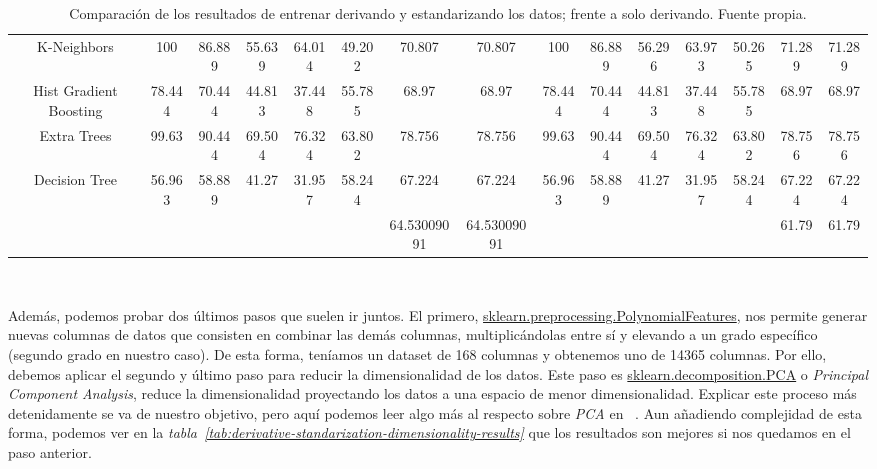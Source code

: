 \begin{table}[!ht]
{\begin{tabular}{|c|ccccccc|ccccccc|}
        K-Neighbors & 100 & 86.889 & 55.639 & 64.014 & 49.202 & 70.807 & 70.807 & 100 & 86.889 & 56.296 & 63.973 & 50.265 & 71.289 & 71.289 \\
        Hist Gradient Boosting & 78.444 & 70.444 & 44.813 & 37.448 & 55.785 & 68.97 & 68.97 & 78.444 & 70.444 & 44.813 & 37.448 & 55.785 & 68.97 & 68.97 \\
        Extra Trees & 99.63 & 90.444 & 69.504 & 76.324 & 63.802 & 78.756 & 78.756 & 99.63 & 90.444 & 69.504 & 76.324 & 63.802 & 78.756 & 78.756 \\
        Decision Tree & 56.963 & 58.889 & 41.27 & 31.957 & 58.244 & 67.224 & 67.224 & 56.963 & 58.889 & 41.27 & 31.957 & 58.244 & 67.224 & 67.224 \\ \hline
        & & & & & & 64.53009091 & 64.53009091 & & & & & & 61.79 & 61.79 \\ \hline
        \end{tabular}}
    \caption{Comparación de los resultados de entrenar derivando y estandarizando los datos; frente a solo derivando. Fuente propia.}\ \label{tab:derivative-standarization-results}
\end{table}


Además, podemos probar dos últimos pasos que suelen ir juntos. El primero, \href{https://scikit-learn.org/stable/modules/generated/sklearn.preprocessing.PolynomialFeatures.html}{sklearn.preprocessing.PolynomialFeatures}, 
nos permite generar nuevas columnas de datos que consisten en combinar las demás columnas, multiplicándolas entre sí y elevando a un grado específico (segundo grado en nuestro caso). 
De esta forma, teníamos un \gls{dataset} de 168 columnas y obtenemos uno de 14365 columnas. Por ello, debemos aplicar el segundo y último paso para reducir la dimensionalidad
de los datos. Este paso es \href{https://scikit-learn.org/stable/modules/generated/sklearn.decomposition.PCA.html}{sklearn.decomposition.PCA} o \textit{Principal Component Analysis},
reduce la dimensionalidad proyectando los datos a una espacio de menor dimensionalidad. Explicar este proceso más detenidamente se va de nuestro objetivo, pero
aquí podemos leer algo más al respecto sobre \textit{PCA} en \ \cite{Principa62:online}.
Aun añadiendo complejidad de esta forma, podemos ver en la \textit{tabla\ \ref{tab:derivative-standarization-dimensionality-results}} que los resultados son mejores si
nos quedamos en el paso anterior.

